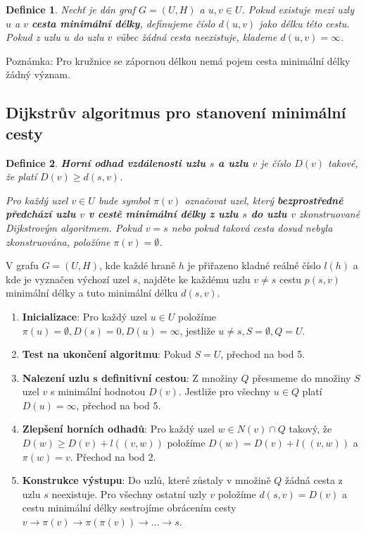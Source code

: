 \documentclass[a4paper, 11pt]{report}
\newtheorem{mydef}{Definice}[chapter]
\begin{document}
\begin{mydef}
Nechť je dán graf $G=(U, H)$ a $u, v \in U$. Pokud existuje mezi uzly $u$ a $v$ \textbf{cesta minimální délky}, definujeme číslo $d(u, v)$ jako délku této cestu. Pokud z uzlu $u$ do uzlu $v$ vůbec žádná cesta neexistuje, klademe $d(u, v) = \infty$.
\end{mydef}
Poznámka: Pro kružnice se zápornou délkou nemá pojem cesta minimální délky žádný význam.

\subsection{Dijkstrův algoritmus pro stanovení minimální cesty}
\begin{mydef}
\textbf{Horní odhad vzdálenosti uzlu $s$ a uzlu $v$} je číslo $D(v)$ takové, že platí $D(v) \geq d(s,v)$.

Pro každý uzel $v \in U$ bude symbol $\pi(v)$ označovat uzel, který \textbf{bezprostředně předchází uzlu $v$ v cestě minimální délky z uzlu $s$ do uzlu $v$} zkonstruované Dijkstrovým algoritmem. Pokud $v=s$ nebo pokud taková cesta dosud nebyla zkonstruována, položíme $\pi(v) = \emptyset$.
\end{mydef}

V grafu $G = (U, H)$, kde každé hraně $h$ je přiřazeno kladné reálné číslo $l(h)$ a kde je vyznačen výchozí uzel $s$, najděte ke každému uzlu $v \not= s$ cestu $p(s,v)$ minimální délky a tuto minimální délku $d(s, v)$.

\begin{enumerate}
	\item \textbf{Inicializace}: Pro každý uzel $u \in U$ položíme $\pi(u) = \emptyset, D(s) = 0, D(u) = \infty$, jestliže $u \not= s, S= \emptyset, Q = U$.
	\item \textbf{Test na ukončení algoritmu}: Pokud $S = U$, přechod na bod 5.
	\item \textbf{Nalezení uzlu s definitivní cestou}: Z množiny $Q$ přesuneme do množiny $S$ uzel $v$ s minimální hodnotou $D(v)$. Jestliže pro všechny $u \in Q$ platí $D(u) = \infty$, přechod na bod 5.
	\item \textbf{Zlepšení horních odhadů}: Pro každý uzel $w \in N(v) \cap Q$ takový, že $D(w) \geq D(v) + l((v, w))$ položíme $D(w) = D(v) + l((v, w))$ a $\pi(w) = v$. Přechod na bod 2.
	\item \textbf{Konstrukce výstupu}: Do uzlů, které zůstaly v množině $Q$ žádná cesta z uzlu $s$ neexistuje. Pro všechny ostatní uzly $v$ položíme $d(s, v) = D(v)$ a cestu minimální délky sestrojíme obrácením cesty $v \to \pi(v) \to \pi(\pi(v)) \to \dots \to s$.
\end{enumerate}
\end{document}
